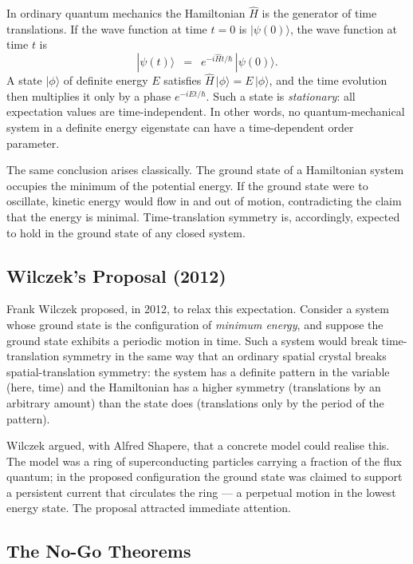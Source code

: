 \documentclass[11pt]{article}
\newcommand{\ket}[1]{|#1\rangle}
\begin{document}
In ordinary quantum mechanics the Hamiltonian $\hat{H}$ is the generator of time translations. If the wave function at time $t = 0$ is $\ket{\psi(0)}$, the wave function at time $t$ is
\begin{equation}
\ket{\psi(t)} \;\:=\;\: e^{-i\hat{H}t/\hbar}\,\ket{\psi(0)}.
\label{eq:evolution}
\end{equation}
A state $\ket{\phi}$ of definite energy $E$ satisfies $\hat{H}\,\ket{\phi} = E\,\ket{\phi}$, and the time evolution then multiplies it only by a phase $e^{-iEt/\hbar}$. Such a state is \emph{stationary}: all expectation values are time-independent. In other words, no quantum-mechanical system in a definite energy eigenstate can have a time-dependent order parameter.

The same conclusion arises classically. The ground state of a Hamiltonian system occupies the minimum of the potential energy. If the ground state were to oscillate, kinetic energy would flow in and out of motion, contradicting the claim that the energy is minimal. Time-translation symmetry is, accordingly, expected to hold in the ground state of any closed system.

\subsection{Wilczek's Proposal (2012)}

Frank Wilczek proposed, in 2012, to relax this expectation. Consider a system whose ground state is the configuration of \emph{minimum energy}, and suppose the ground state exhibits a periodic motion in time. Such a system would break time-translation symmetry in the same way that an ordinary spatial crystal breaks spatial-translation symmetry: the system has a definite pattern in the variable (here, time) and the Hamiltonian has a higher symmetry (translations by an arbitrary amount) than the state does (translations only by the period of the pattern).

Wilczek argued, with Alfred Shapere, that a concrete model could realise this. The model was a ring of superconducting particles carrying a fraction of the flux quantum; in the proposed configuration the ground state was claimed to support a persistent current that circulates the ring --- a perpetual motion in the lowest energy state. The proposal attracted immediate attention.

\subsection{The No-Go Theorems}
\end{document}
